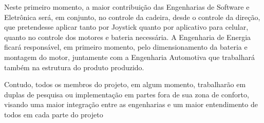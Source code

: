 Neste primeiro momento, a maior contribuição das Engenharias de Software e Eletrônica será, em conjunto, no controle da cadeira, desde o controle da direção, que pretendesse aplicar tanto por Joystick quanto por aplicativo para celular, quanto no controle dos motores e bateria necessária. A Engenharia de Energia ficará responsável, em primeiro momento, pelo dimensionamento da bateria e montagem do motor, juntamente com a Engenharia Automotiva que trabalhará também na estrutura do produto produzido.

Contudo, todos os membros do projeto, em algum momento, trabalharão em duplas de pesquisa ou implementação em partes fora de sua zona de conforto, visando uma maior integração entre as engenharias e um maior entendimento de todos em cada parte do projeto
